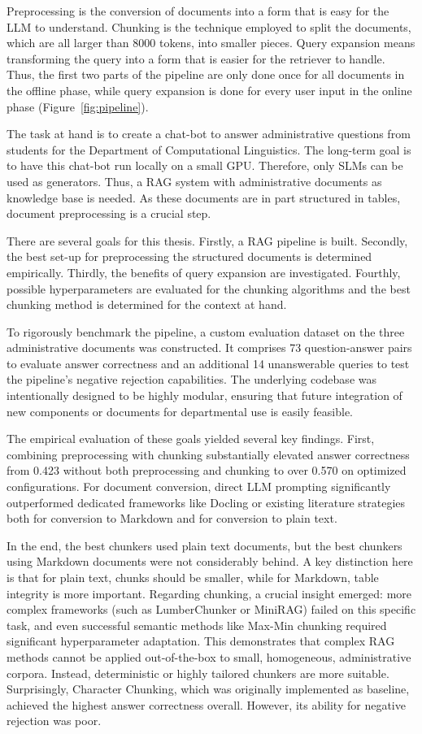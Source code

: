 \documentclass[12pt]{article} %
\begin{document}
Preprocessing is the conversion of documents into a form that is easy for the LLM to understand. Chunking is the technique employed to split the documents, which are all larger than 8000 tokens, into smaller pieces. Query expansion means transforming the query into a form that is easier for the retriever to handle. Thus, the first two parts of the pipeline are only done once for all documents in the offline phase, while query expansion is done for every user input in the online phase (Figure~\ref{fig:pipeline}).

The task at hand is to create a chat-bot to answer administrative questions from students for the Department of Computational Linguistics. The long-term goal is to have this chat-bot run locally on a small GPU. Therefore, only SLMs can be used as generators. Thus, a RAG system with administrative documents as knowledge base is needed. As these documents are in part structured in tables, document preprocessing is a crucial step.

There are several goals for this thesis. Firstly, a RAG pipeline is built. Secondly, the best set-up for preprocessing the structured documents is determined empirically. Thirdly, the benefits of query expansion are investigated. Fourthly, possible hyperparameters are evaluated for the chunking algorithms and the best chunking method is determined for the context at hand.

To rigorously benchmark the pipeline, a custom evaluation dataset on the three administrative documents was constructed. It comprises 73 question-answer pairs to evaluate answer correctness and an additional 14 unanswerable queries to test the pipeline's negative rejection capabilities. The underlying codebase was intentionally designed to be highly modular, ensuring that future integration of new components or documents for departmental use is easily feasible.

The empirical evaluation of these goals yielded several key findings. First, combining preprocessing with chunking substantially elevated answer correctness from 0.423 without both preprocessing and chunking to over 0.570 on optimized configurations. For document conversion, direct LLM prompting significantly outperformed dedicated frameworks like Docling or existing literature strategies both for conversion to Markdown and for conversion to plain text.

In the end, the best chunkers used plain text documents, but the best chunkers using Markdown documents were not considerably behind. A key distinction here is that for plain text, chunks should be smaller, while for Markdown, table integrity is more important. Regarding chunking, a crucial insight emerged: more complex frameworks (such as LumberChunker or MiniRAG) failed on this specific task, and even successful semantic methods like Max-Min chunking required significant hyperparameter adaptation. This demonstrates that complex RAG methods cannot be applied out-of-the-box to small, homogeneous, administrative corpora. Instead, deterministic or highly tailored chunkers are more suitable. Surprisingly, Character Chunking, which was originally implemented as baseline, achieved the highest answer correctness overall. However, its ability for negative rejection was poor.
\end{document}
